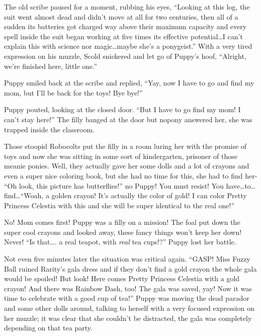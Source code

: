 The old scribe paused for a moment, rubbing his eyes, ``Looking at this log, the suit went almost dead and didn't move at all for two centuries, then all of a sudden its batteries got charged way above their maximum capacity and every spell inside the suit began working at five times its effective potential\dots I can't explain this with science nor magic\dots maybe she's a ponygeist.'' With a very tired expression on his muzzle, Scold snickered and let go of Puppy's hoof, ``Alright, we're finished here, little one.''

Puppy smiled back at the scribe and replied, ``Yay, now I have to go and find my mom, but I'll be back for the toys! Bye bye!''

\horizonline


Puppy pouted, looking at the closed door. ``But I have to go find my mom! I can't stay here!'' The filly banged at the door but nopony answered her, she was trapped inside the classroom.

Those stoopid Robocolts put the filly in a room luring her with the promise of toys and now she was sitting in some sort of kindergarten, prisoner of those meanie ponies. Well, they actually gave her some dolls and a lot of crayons and even a super nice coloring book, but she had no time for this, she had to find her- ``Oh look, this picture has butterflies!'' no Puppy! You must resist! You have\dots to\dots find\dots ``Woah, a golden crayon! It's actually the color of gold! I can color Pretty Princess Celestia with this and she will be super identical to the real one!''

No! Mom comes first! Puppy was a filly on a mission! The foal put down the super cool crayons and looked away, these fancy things won't keep her down! Never! ``Is that\dots. a real teapot, with \emph{real} tea cups!?'' Puppy lost her battle.

Not even five minutes later the situation was critical again. ``GASP! Miss Fuzzy Ball ruined Rarity's gala dress and if they don't find a gold crayon the whole gala would be spoiled! But look! Here comes Pretty Princess Celestia with a gold crayon! And there was Rainbow Dash, too! The gala was saved, yay! Now it was time to celebrate with a good cup of tea!'' Puppy was moving the dead parador and some other dolls around, talking to herself with a very focused expression on her muzzle; it was clear that she couldn't be distracted, the gala was completely depending on that tea party.


